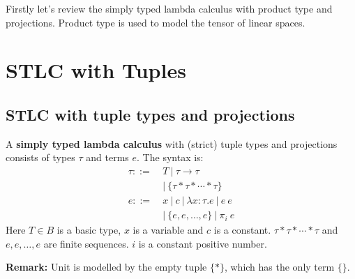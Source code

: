   
% 

Firstly let's review the simply typed lambda calculus with product type and projections. Product type is used to model the tensor of linear spaces.

\section{STLC with Tuples}

\subsection{STLC with tuple types and projections}

\begin{definition}
    A \textbf{simply typed lambda calculus} with (strict) tuple types and projections consists of types $\tau$ and terms $e$. The syntax is:
    \begin{align*}
        \tau ::=&\ T\ |\ \tau \to \tau\\
          &\ |\ \{ \tau * \tau * \cdots * \tau \} \\
        e ::=&\ x\ |\ c\ |\ \lambda x : \tau. e\ |\ e\ e\\
          &\ |\ \{ e, e, \dots, e \}\ |\ \pi_i\ e
    \end{align*}
    Here $T \in B$ is a basic type, $x$ is a variable and $c$ is a constant.
    $\tau * \tau * \cdots * \tau$ and $e, e, \dots, e$ are finite sequences. $i$ is a constant positive number.
\end{definition}

\textbf{Remark:} Unit is modelled by the empty tuple $\{*\}$, which has the only term $\{\}$.

